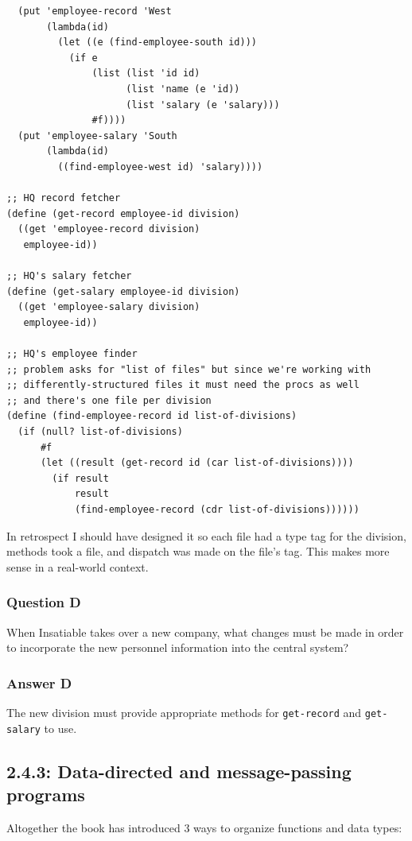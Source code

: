 \documentclass[final,fleqn,titlepage,twoside]{article}
\begin{document}
\begin{verbatim}
  (put 'employee-record 'West
       (lambda(id)
         (let ((e (find-employee-south id)))
           (if e
               (list (list 'id id)
                     (list 'name (e 'id))
                     (list 'salary (e 'salary)))
               #f))))
  (put 'employee-salary 'South
       (lambda(id)
         ((find-employee-west id) 'salary))))

;; HQ record fetcher
(define (get-record employee-id division)
  ((get 'employee-record division)
   employee-id))

;; HQ's salary fetcher
(define (get-salary employee-id division)
  ((get 'employee-salary division)
   employee-id))

;; HQ's employee finder
;; problem asks for "list of files" but since we're working with
;; differently-structured files it must need the procs as well
;; and there's one file per division
(define (find-employee-record id list-of-divisions)
  (if (null? list-of-divisions)
      #f
      (let ((result (get-record id (car list-of-divisions))))
        (if result
            result
            (find-employee-record (cdr list-of-divisions))))))
\end{verbatim}


In retrospect I should have designed it so each file had a type tag for the division, methods took a file, and dispatch was made on the file's tag. This makes more sense in a real-world context.

\subsubsection{Question D}
\label{sec:org0bdde59}
When Insatiable takes over a new company, what changes must be made in order to
incorporate the new personnel information into the central system?

\subsubsection{Answer D}
\label{sec:orgf581034}
The new division must provide appropriate methods for \texttt{get-record} and
\texttt{get-salary} to use.

\subsection{2.4.3: Data-directed and message-passing programs}
\label{sec:orgbd8d313}
Altogether the book has introduced 3 ways to organize functions and data types:
\end{document}
